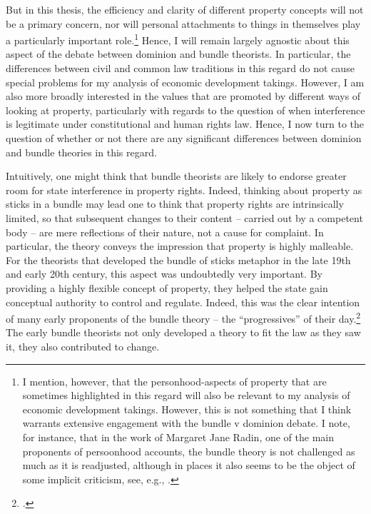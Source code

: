 \documentclass[12pt,a4paper]{book} %
\begin{document}
But in this thesis, the efficiency and clarity of different property concepts will not be a primary concern, nor will personal attachments to things in themselves play a particularly important role.\footnote{I mention, however, that the personhood-aspects of property that are sometimes highlighted in this regard will also be relevant to my analysis of economic development takings. However, this is not something that I think warrants extensive engagement with the bundle v dominion debate. I note, for instance, that in the work of Margaret Jane Radin, one of the main proponents of persoonhood accounts, the bundle theory is not challenged as much as it is readjusted, although in places it also seems to be the object of some implicit criticism, see, e.g., \cite[127-130]{radin93}.}
Hence, I will remain largely agnostic about this aspect of the debate between dominion and bundle theorists. In particular, the differences between civil and common law traditions in this regard do not cause special problems for my analysis of economic development takings. However, I am also more broadly interested in the values that are promoted by different ways of looking at property, particularly with regards to the question of when interference is legitimate under constitutional and human rights law. Hence, I  now turn to the question of whether or not there are any significant differences between dominion and bundle theories in this regard.

Intuitively, one might think that bundle theorists are likely to endorse greater room for state interference in property rights. Indeed, thinking about property as sticks in a bundle may lead one to think that property rights are intrinsically limited, so that subsequent changes to their content -- carried out by a competent body -- are mere reflections of their nature, not a cause for complaint. In particular, the theory conveys the impression that property is highly malleable. For the theorists that developed the bundle of sticks metaphor in the late 19th and early 20th century, this aspect was undoubtedly very important. By providing a highly flexible concept of property, they helped the state gain conceptual authority to control and regulate. Indeed, this was the clear intention of many early proponents of the bundle theory -- the ``progressives'' of their day.\footcite[195]{klein11} The early bundle theorists not only developed a theory to fit the law as they saw it, they also contributed to change.
\end{document}
